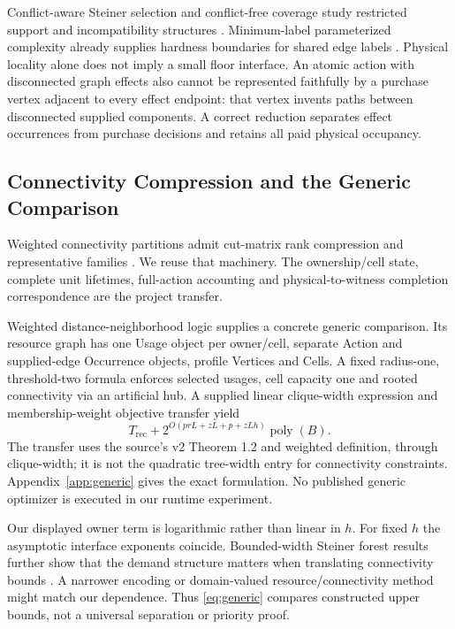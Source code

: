 \documentclass[conference]{IEEEtran}
\newcommand{\poly}{\operatorname{poly}}
\begin{document}
Conflict-aware Steiner selection and conflict-free coverage study restricted support and incompatibility structures \cite{conflicts,conflictcover}. Minimum-label parameterized complexity already supplies hardness boundaries for shared edge labels \cite{minlabel}. Physical locality alone does not imply a small floor interface. An atomic action with disconnected graph effects also cannot be represented faithfully by a purchase vertex adjacent to every effect endpoint: that vertex invents paths between disconnected supplied components. A correct reduction separates effect occurrences from purchase decisions and retains all paid physical occupancy.

\subsection{Connectivity Compression and the Generic Comparison}
Weighted connectivity partitions admit cut-matrix rank compression and representative families \cite{rank}. We reuse that machinery. The ownership/cell state, complete unit lifetimes, full-action accounting and physical-to-witness completion correspondence are the project transfer.

Weighted distance-neighborhood logic \cite{logic} supplies a concrete generic comparison. Its resource graph has one Usage object per owner/cell, separate Action and supplied-edge Occurrence objects, profile Vertices and Cells. A fixed radius-one, threshold-two formula enforces selected usages, cell capacity one and rooted connectivity via an artificial hub. A supplied linear clique-width expression and membership-weight objective transfer yield
\begin{equation}
T_{\mathrm{rec}}+2^{O(prL+zL+p+zLh)}\poly(B).
\label{eq:generic}
\end{equation}
The transfer uses the source's v2 Theorem 1.2 and weighted definition, through clique-width; it is not the quadratic tree-width entry for connectivity constraints. Appendix~\ref{app:generic} gives the exact formulation. No published generic optimizer is executed in our runtime experiment.

Our displayed owner term is logarithmic rather than linear in $h$. For fixed $h$ the asymptotic interface exponents coincide. Bounded-width Steiner forest results further show that the demand structure matters when translating connectivity bounds \cite{steinerwidth}. A narrower encoding or domain-valued resource/connectivity method might match our dependence. Thus \eqref{eq:generic} compares constructed upper bounds, not a universal separation or priority proof.
\end{document}
